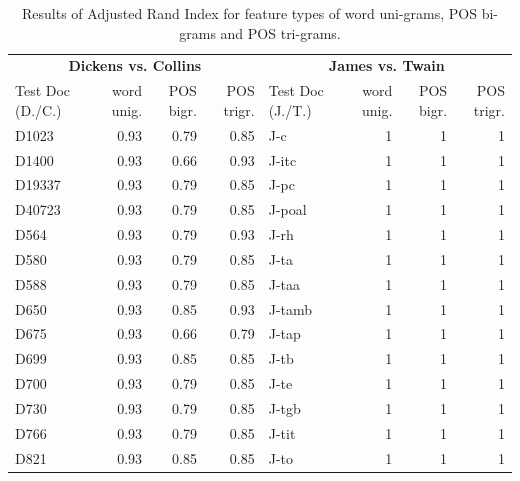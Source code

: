 \documentclass[a4paper,10pt,twoside,fleqn]{article}
\begin{document}
\begin{table}
\small 

\caption{Results of Adjusted Rand Index for feature types of word uni-grams, POS bi-grams and POS tri-grams.}
\label{tab:results-clust}
 \begin{tabular}{lrrrlrrr} \toprule[1.2pt]
  \multicolumn{4}{c}{\textbf{Dickens vs. Collins}} & \multicolumn{4}{c}{\textbf{James vs. Twain}} \\
   \cmidrule(r){1-4} 
    \cmidrule(r){5-8} 
Test Doc (D./C.) & word unig. & POS bigr. & POS trigr. & Test Doc (J./T.) & word unig. & POS bigr. & POS trigr.\\ \midrule
D1023    & 0.93 & 0.79 & 0.85 &        J-c    &    1    &    1    &    1   \\
D1400    & 0.93 & 0.66 & 0.93 &      J-itc    &    1    &    1    &    1   \\
D19337   & 0.93 & 0.79 & 0.85 &       J-pc    &    1    &    1    &    1   \\
D40723   & 0.93 & 0.79 & 0.85 &     J-poal    &    1    &    1    &    1   \\
D564     & 0.93 & 0.79 & 0.93 &       J-rh    &    1    &    1    &    1   \\
D580     & 0.93 & 0.79 & 0.85 &       J-ta    &    1    &    1    &    1   \\
D588     & 0.93 & 0.79 & 0.85 &      J-taa    &    1    &    1    &    1   \\
D650     & 0.93 & 0.85 & 0.93 &     J-tamb    &    1    &    1    &    1   \\
D675     & 0.93 & 0.66 & 0.79 &      J-tap    &    1    &    1    &    1   \\
D699     & 0.93 & 0.85 & 0.85 &       J-tb    &    1    &    1    &    1   \\
D700     & 0.93 & 0.79 & 0.85 &       J-te    &    1    &    1    &    1   \\
D730     & 0.93 & 0.79 & 0.85 &      J-tgb    &    1    &    1    &    1   \\
D766     & 0.93 & 0.79 & 0.85 &      J-tit    &    1    &    1    &    1   \\
D821     & 0.93 & 0.85 & 0.85 &       J-to    &    1    &    1    &    1   \\

\end{tabular}
\end{table}
\end{document}
